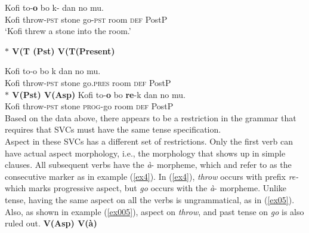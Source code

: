 \documentclass[output=paper,
modfonts
]{langscibook}
\begin{document}
\ea\label{ex01} 
\gll Kofi to-\textbf{o} bo k- dan no mu. \\
    Kofi throw-\textsc{pst} stone go-\textsc{pst} room \textsc{def} PostP   \\
\glt `Kofi threw a stone into the room.'

\z 
\ex\label{ex2}
\textbf{$\ast$ \phantom {} {} {}  V(T (Pst)\phantom {} {} {}   V(T(Present)} 
     \ea\label{ex001} 

\gll * Kofi to-o bo  k dan no mu.\\
	{} Kofi throw-\textsc{pst} stone  go.\textsc{pres} room \textsc{def} PostP\\
\z 
\ex\label{ex3}
\textbf{$\ast$ \phantom {} {} {}  V(Pst)\phantom {} {} {}   V(Asp)} 
     \ea\label{ex0001} 
\gll * Kofi to-\textbf{o} bo  \textbf{re}-k dan no mu.\\
	{} Kofi throw-\textsc{pst} stone  \textsc{prog}-go room  \textsc{def} PostP\\	
\z 
\z \z 
Based on the data above, there appears to be a restriction in the grammar that requires that SVCs must have the same tense specification.   \\ 
Aspect in these SVCs has a different set of restrictions. Only the first verb can have actual aspect morphology, i.e., the morphology that shows up in simple clauses. All subsequent verbs have the \emph{\`a}- morpheme, which \citet{Dolphyne1996} and \citet{Osam2003} refer to as the consecutive marker as in example (\ref{ex4}). In (\ref{ex4}), \emph{throw} occurs with prefix \emph{re-} which marks progressive aspect, but \emph{go} occurs with the \emph{\`a}- morpheme. Unlike tense, having the same aspect on all the verbs is ungrammatical, as in (\ref{ex05}). Also, as shown in example (\ref{ex005}), aspect on \emph{throw}, and past tense on \emph{go} is also ruled out. 
\ea \label{ex04}
\ea \textbf{V(Asp) \phantom {} {} {} V(\`a)}
\end{document}
